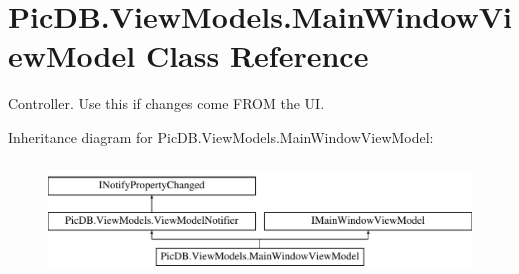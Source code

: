 \hypertarget{class_pic_d_b_1_1_view_models_1_1_main_window_view_model}{}\section{Pic\+D\+B.\+View\+Models.\+Main\+Window\+View\+Model Class Reference}
\label{class_pic_d_b_1_1_view_models_1_1_main_window_view_model}


Controller. Use this if changes come F\+R\+OM the UI.  


Inheritance diagram for Pic\+D\+B.\+View\+Models.\+Main\+Window\+View\+Model\+:\begin{figure}[H]
\begin{center}
\leavevmode
\includegraphics[height=3.000000cm]{class_pic_d_b_1_1_view_models_1_1_main_window_view_model}
\end{center}
\end{figure}
